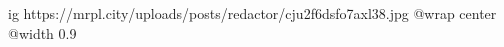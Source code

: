  
 
 
 
 

\ifcmt
  ig https://mrpl.city/uploads/posts/redactor/cju2f6dsfo7axl38.jpg
  @wrap center
  @width 0.9
\fi
